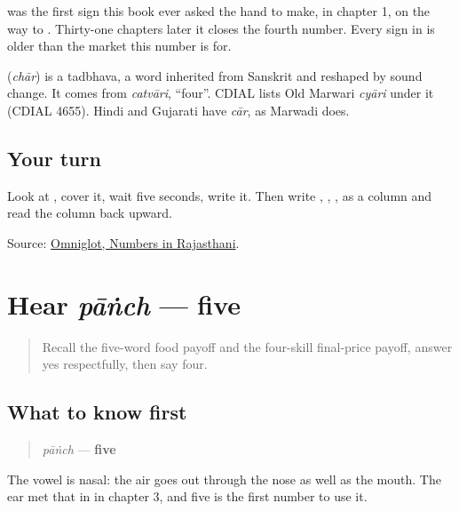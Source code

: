 \textbf{} was the first sign this book ever asked the hand to make, in chapter 1, on the way to \textbf{}. Thirty-one chapters later it closes the fourth number. Every sign in \textbf{} is older than the market this number is for.

\begin{cousinweb}
\textbf{} (\emph{chār}) is a tadbhava, a word inherited from Sanskrit and reshaped by sound change. It comes from \emph{catvāri}, \textquotedblleft{}four\textquotedblright{}. CDIAL lists Old Marwari \emph{cyāri} under it (CDIAL 4655). Hindi and Gujarati have \emph{cār}, as Marwadi does.
\end{cousinweb}

\subsection*{Your turn}
Look at \textbf{}, cover it, wait five seconds, write it. Then write \textbf{}, \textbf{}, \textbf{}, \textbf{} as a column and read the column back upward.

\begin{tcolorbox}[breakable,colback=teal!4,colframe=teal!35!black,title={Before you move on}]
Source: \href{https://www.omniglot.com/language/numbers/rajasthani.htm}{Omniglot, Numbers in Rajasthani}.
\end{tcolorbox}
\section[pāṅch]{Hear \emph{pāṅch} — five}

\label{lesson:MW-C32-hear-paanch}



\begin{quote}
Recall the five-word food payoff and the four-skill final-price payoff, answer yes respectfully, then say four.
\end{quote}

\subsection*{What to know first}
\begin{quote}
\emph{pāṅch} — \textbf{five}
\end{quote}

The vowel is nasal: the air goes out through the nose as well as the mouth. The ear met that in \textbf{ } in chapter 3, and five is the first number to use it.

